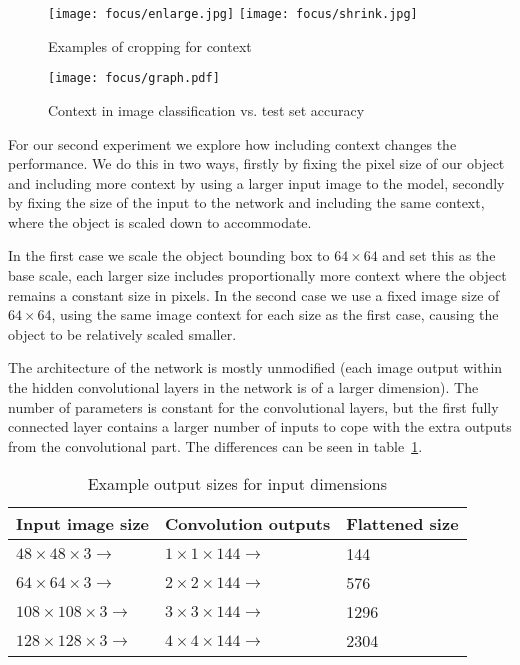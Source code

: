 \begin{figure*}[t]
    \caption{Examples of cropping for context}
\centering
\texttt{[image: focus/enlarge.jpg]}
\texttt{[image: focus/shrink.jpg]}
\label{fig:focus_context}
\end{figure*}




\begin{figure}[h]
    \caption{Context in image classification vs. test set accuracy}
\centering
\texttt{[image: focus/graph.pdf]}
\label{fig:focus_exp2}
\end{figure}

For our second experiment we explore how including context changes the performance. We do this in two ways, firstly by fixing the pixel size of our object and including more context by using a larger input image to the model, secondly by fixing the size of the input to the network and including the same context, where the object is scaled down to accommodate.

In the first case we scale the object bounding box to $ 64 \times 64 $ and set this as the base scale, each larger size includes proportionally more context where the object remains a constant size in pixels. In the second case we use a fixed image size of $ 64 \times 64 $, using the same image context for each size as the first case, causing the object to be relatively scaled smaller.

The architecture of the network is mostly unmodified (each image output within the hidden convolutional layers in the network is of a larger dimension). The number of parameters is constant for the convolutional layers, but the first fully connected layer contains a larger number of inputs to cope with the extra outputs from the convolutional part. The differences can be seen in table~\ref{fig:focus_sizes}.


\begin{table}[h]
  \centering
    \caption{Example output sizes for input dimensions }
\begin{tabular}{ l l l } 
 
 \toprule
 Input image size & Convolution outputs & Flattened size \\
 \toprule
 
 $ 48 \times 48 \times 3 \rightarrow $ & $ 1\times1\times144 \rightarrow $ & 144 \\
 $ 64 \times 64 \times 3 \rightarrow $ & $ 2\times2\times144 \rightarrow $ & 576 \\
 $ 108 \times 108 \times 3 \rightarrow $ & $ 3\times3\times144 \rightarrow $ & 1296 \\
 $ 128 \times 128 \times 3 \rightarrow $ & $ 4\times4\times144 \rightarrow $ & 2304 \\
 
\end{tabular}
\label{fig:focus_sizes}
\end{table}

